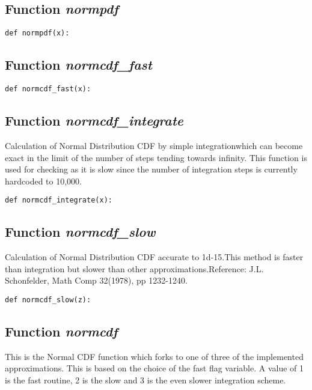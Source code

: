 \documentclass[twoside,11pt]{book}
\begin{document}
\subsection{Function {\it normpdf}}


\begin{lstlisting}
def normpdf(x):
\end{lstlisting}

\subsection{Function {\it normcdf\_fast}}


\begin{lstlisting}
def normcdf_fast(x):
\end{lstlisting}

\subsection{Function {\it normcdf\_integrate}}
Calculation of Normal Distribution CDF by simple integrationwhich can become exact in the limit of the number of steps tending towards infinity. This function is used for checking as it is slow since the number of integration steps is currently hardcoded to 10,000.

\begin{lstlisting}
def normcdf_integrate(x):
\end{lstlisting}

\subsection{Function {\it normcdf\_slow}}
Calculation of Normal Distribution CDF accurate to 1d-15.This method is faster than integration but slower than other approximations.Reference: J.L. Schonfelder, Math Comp 32(1978), pp 1232-1240. 

\begin{lstlisting}
def normcdf_slow(z):
\end{lstlisting}

\subsection{Function {\it normcdf}}
This is the Normal CDF function which forks to one of three of the implemented approximations. This is based on the choice of the fast flag variable. A value of 1 is the fast routine, 2 is the slow and 3 is the even slower integration scheme. 
\end{document}
